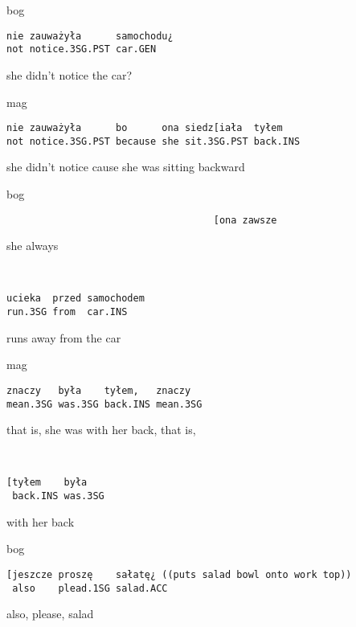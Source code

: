 \documentclass[output=paper]{langsci/langscibook}
\begin{document}
\vspace{2mm}
%
\begin{transbox}{1}{bog}
\begin{verbatim}
nie zauważyła      samochodu¿
not notice.3SG.PST car.GEN
\end{verbatim}
she didn’t notice the car?
\end{transbox}
%
\begin{transbox}{2}{mag}
\begin{verbatim}
nie zauważyła      bo      ona siedz[iała  tyłem
not notice.3SG.PST because she sit.3SG.PST back.INS
\end{verbatim}
she didn’t notice cause she was sitting backward
\end{transbox}
%
\begin{transbox}{3}{bog}
\begin{verbatim}
                                    [ona zawsze
\end{verbatim}
\hspace{5.4cm} she always
\end{transbox}
%
\begin{transbox}{4}{~}
\begin{verbatim}
ucieka  przed samochodem
run.3SG from  car.INS
\end{verbatim}
runs away from the car
\end{transbox}
%
\begin{transbox}{5}{mag}
\begin{verbatim}
znaczy   była    tyłem,   znaczy
mean.3SG was.3SG back.INS mean.3SG
\end{verbatim}
that is, she was with her back, that is,
\end{transbox}
%
\begin{transbox}{6}{~}
\begin{verbatim}
[tyłem    była
 back.INS was.3SG
\end{verbatim}
\hspace{0.07cm} with her back
\end{transbox}
%
\begin{mdframednoverticalspace}[style=firstfoc]
\begin{transbox}{7}{bog}
\begin{verbatim}
[jeszcze proszę    sałatę¿ ((puts salad bowl onto work top))
 also    plead.1SG salad.ACC
\end{verbatim}
\hspace{0.07cm} also, please, salad
\end{transbox}
\end{mdframednoverticalspace}
%
\\
\end{document}
